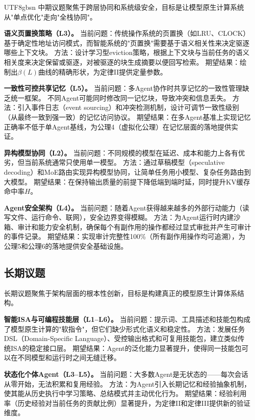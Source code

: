 \documentclass[11pt,a4paper]{article}
\begin{document}
\begin{CJK*}{UTF8}{gbsn}
中期议题聚焦于跨层协同和系统级安全，目标是让模型原生计算系统从"单点优化"走向"全栈协同"。

\textbf{语义页置换策略（L3）。}
当前问题：传统操作系统的页置换（如LRU、CLOCK）基于确定性地址访问模式，而智能系统的"页置换"需要基于语义相关性来决定驱逐哪些上下文块。
方法：设计学习型eviction策略，根据上下文块与当前任务的语义相关度来决定保留或驱逐，对被驱逐的块生成摘要以便回写检索。
期望结果：绘制出$\beta(L)$曲线的精确形状，为定律II提供定量参数。

\textbf{一致性可控共享记忆（L5）。}
当前问题：多Agent协作时共享记忆的一致性管理缺乏统一框架。
不同Agent可能同时修改同一记忆块，导致冲突和信息丢失。
方法：引入事件日志（event sourcing）和冲突检测机制，设计可调节一致性级别（从最终一致到强一致）的记忆访问协议\cite{raft2014,cap2002}。
期望结果：在多Agent基准上实现记忆正确率不低于单Agent基线，为公理4（虚拟化公理）在记忆层面的落地提供实证。

\textbf{异构模型协同（L2）。}
当前问题：不同规模的模型在延迟、成本和能力上各有优劣，但当前系统通常只使用单一模型。
方法：通过草稿模型（speculative decoding\cite{leviathan2023speculative}）和MoE路由\cite{switch2022,mixtral2024}实现异构模型协同，让简单任务用小模型、复杂任务路由到大模型。
期望结果：在保持输出质量的前提下降低端到端时延，同时提升KV缓存命中率$H$。

\textbf{Agent安全架构（L4）。}
当前问题：随着Agent获得越来越多的外部行动能力（读写文件、运行命令、联网），安全边界变得模糊。
方法：为Agent运行时内建沙箱、审计和能力安全机制\cite{debenedetti2025camel,ironclaw2025,agenticsecurity2025}，确保每个有副作用的操作都经过显式审批并产生可审计的事件记录。
期望结果：实现审计完整性100\%（所有副作用操作均可追溯），为公理5和公理6的落地提供安全基础设施。

\subsection{长期议题}

长期议题聚焦于架构层面的根本性创新，目标是构建真正的模型原生计算体系结构。

\textbf{智能ISA与可编程技能层（L1--L6）。}
当前问题：提示词、工具描述和技能包构成了模型原生计算的"软指令"，但它们缺少形式化语义和稳定性。
方法：发展任务DSL（Domain-Specific Language）、受控输出格式和可复用技能包，建立类似传统ISA的稳定接口层。
期望结果：Agent的泛化能力显著提升，使得同一技能包可以在不同模型和运行时之间无缝迁移。

\textbf{状态化个体Agent（L3--L5）。}
当前问题：大多数Agent是无状态的——每次会话从零开始，无法积累和复用经验。
方法：为Agent引入长期记忆和经验抽象机制，使其能从历史执行中学习策略、总结模式并主动优化行为\cite{amem2025,agentmemorysurvey2025}。
期望结果：经验利用率（历史经验对当前任务的贡献比例）显著提升，为定律II和定律III提供新的验证维度。


\end{CJK*}
\end{document}
